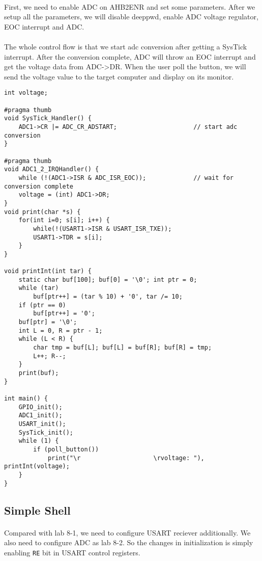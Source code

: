 \paragraph{}
First, we need to enable ADC on AHB2ENR and set some parameters. After we setup all the parameters, we will disable deeppwd, enable ADC voltage regulator, EOC interrupt and ADC.
\paragraph{}
The whole control flow is that we start adc conversion after getting a SysTick interrupt. After the conversion complete, ADC will throw an EOC interrupt and get the voltage data from ADC->DR. When the user poll the button, we will send the voltage value to the target computer and display on its monitor.
\begin{lstlisting}
int voltage;

#pragma thumb
void SysTick_Handler() {
    ADC1->CR |= ADC_CR_ADSTART;                     // start adc conversion
}

#pragma thumb
void ADC1_2_IRQHandler() {
	while (!(ADC1->ISR & ADC_ISR_EOC));             // wait for conversion complete
	voltage = (int) ADC1->DR;
}
void print(char *s) {
    for(int i=0; s[i]; i++) {
        while(!(USART1->ISR & USART_ISR_TXE));
        USART1->TDR = s[i];
    }
}

void printInt(int tar) {
    static char buf[100]; buf[0] = '\0'; int ptr = 0;
    while (tar)
        buf[ptr++] = (tar % 10) + '0', tar /= 10;
    if (ptr == 0)
        buf[ptr++] = '0';
    buf[ptr] = '\0';
    int L = 0, R = ptr - 1;
    while (L < R) {
        char tmp = buf[L]; buf[L] = buf[R]; buf[R] = tmp;
        L++; R--;
    }
    print(buf);
}

int main() {
    GPIO_init();
    ADC1_init();
    USART_init();
    SysTick_init();
    while (1) {
        if (poll_button())
            print("\r                    \rvoltage: "), printInt(voltage);
    }
}
\end{lstlisting}

\subsection{Simple Shell}
\paragraph{}
Compared with lab 8-1, we need to configure USART reciever additionally.
We also need to configure ADC as lab 8-2.
So the changes in initialization is simply enabling \texttt{RE} bit in USART control registers.

